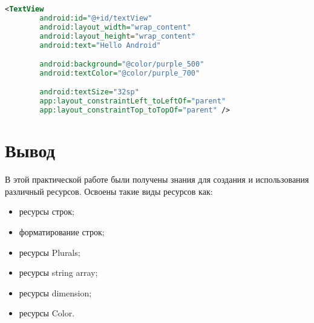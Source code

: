 \begin{lstlisting}[language=xml, caption=\leftline{Объявление ресурсов colors}, label=lst:xml:use]
<TextView
        android:id="@+id/textView"
        android:layout_width="wrap_content"
        android:layout_height="wrap_content"
        android:text="Hello Android"

        android:background="@color/purple_500"
        android:textColor="@color/purple_700"

        android:textSize="32sp"
        app:layout_constraintLeft_toLeftOf="parent"
        app:layout_constraintTop_toTopOf="parent" />
\end{lstlisting}

\clearpage

\section*{\LARGE{Вывод}}
В этой практической работе были получены знания для создания и
использования различный ресурсов. Освоены такие виды ресурсов как:

\begin{itemize}
	\item ресурсы строк;
	\item форматирование строк;
	\item ресурсы Plurals;
	\item ресурсы string array;
	\item ресурсы dimension;
	\item ресурсы Color.
\end{itemize}

